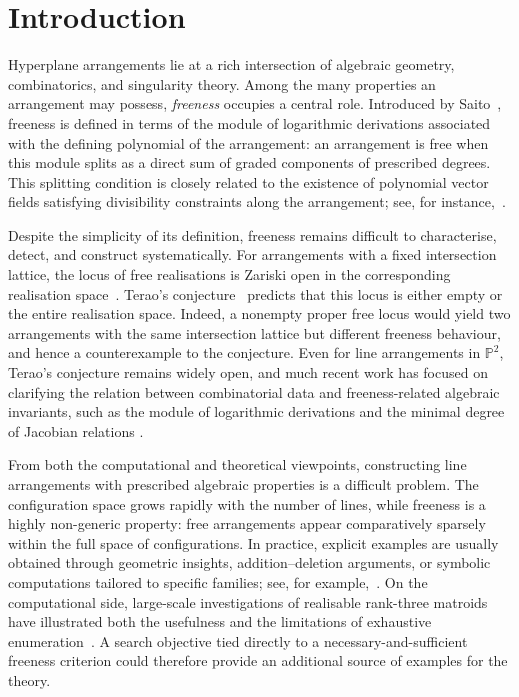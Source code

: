 \documentclass[pdflatex,sn-mathphys-num]{sn-jnl}%
\theoremstyle{remark}
\theoremstyle{definition}
\begin{document}
\newpage

\section{Introduction}
\label{sec:introduction}

Hyperplane arrangements lie at a rich intersection of algebraic geometry, combinatorics, and singularity theory. Among the many properties an arrangement may possess, \emph{freeness} occupies a central role. Introduced by Saito~\cite{Saito1980}, freeness is defined in terms of the module of logarithmic derivations associated with the defining polynomial of the arrangement: an arrangement is free when this module splits as a direct sum of graded components of prescribed degrees. This splitting condition is closely related to the existence of polynomial vector fields satisfying divisibility constraints along the arrangement; see, for instance,~\cite{Orlik1992,Dimca2017,Yoshinaga2014,Jardim2024}.

Despite the simplicity of its definition, freeness remains difficult to characterise, detect, and construct systematically. For arrangements with a fixed intersection lattice, the locus of free realisations is Zariski open in the corresponding realisation space~\cite{Yuzvinsky1993}. Terao's conjecture~\cite{Terao80} predicts that this locus is either empty or the entire realisation space. Indeed, a nonempty proper free locus would yield two arrangements with the same intersection lattice but different freeness behaviour, and hence a counterexample to the conjecture. Even for line arrangements in $\mathbb P^2$, Terao's conjecture remains widely open, and much recent work has focused on clarifying the relation between combinatorial data and freeness-related algebraic invariants, such as the module of logarithmic derivations and the minimal degree of Jacobian relations
\cite{Schenck2012,Dimca17a,Dimca2017b,DIMCA2016,Marchesi_2023,abe2025additiontheoremszieglerpairs,Dimca2026freelinearrangementslow,kuhne2024numericalteraosconjectureziegler,Kuhne_2024,pokora2024construction,Pokora_2024}.

From both the computational and theoretical viewpoints, constructing line arrangements with prescribed algebraic properties is a difficult problem. The configuration space grows rapidly with the number of lines, while freeness is a highly non-generic property: free arrangements appear comparatively sparsely within the full space of configurations. In practice, explicit examples are usually obtained through geometric insights, addition--deletion arguments, or symbolic computations tailored to specific families; see, for example,~\cite{Dimca2017b,Abe2020,pokora2024construction,Kabat2018,Mu2015}. On the computational side, large-scale investigations of realisable rank-three matroids have illustrated both the usefulness and the limitations of exhaustive enumeration~\cite{Barakat2021}. A search objective tied directly to a necessary-and-sufficient freeness criterion could therefore provide an additional source of examples for the theory.
\end{document}
